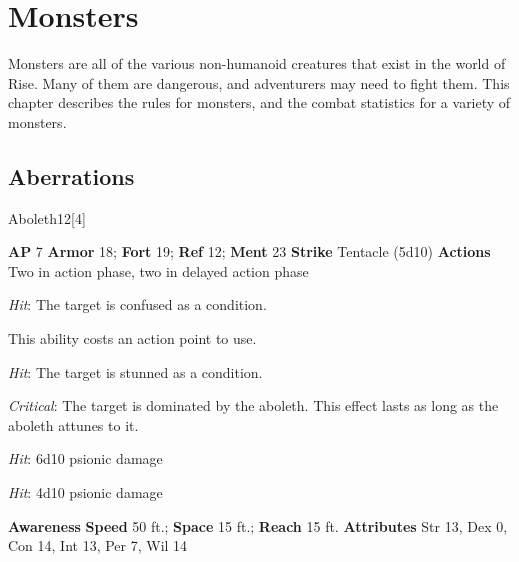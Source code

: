 \chapter{Monsters}
Monsters are all of the various non-humanoid creatures that exist in the world of Rise.
Many of them are dangerous, and adventurers may need to fight them.
This chapter describes the rules for monsters, and the combat statistics for a variety of monsters.
\section{Aberrations}
\begin{monsection}{Aboleth}{12}[4]
\vspace{-1em}\vspace{-1em}
\begin{spellcontent}
\begin{spelltargetinginfo}
{\textbf{AP} 7}
\pari \textbf{Armor} 18;
\textbf{Fort} 19;
\textbf{Ref} 12;
\textbf{Ment} 23
\pari \textbf{Strike} Tentacle  (5d10)
\pari \textbf{Actions} Two in action phase, two in delayed action phase
\end{spelltargetinginfo}
\begin{spelleffects}
\pari
{}
\par
\par \textit{Hit}: The target is confused as a condition.
\vspace{0.5em}
\pari
{}
\par
This ability costs an action point to use.
\par \textit{Hit}: The target is stunned as a condition.
\par \textit{Critical}:
The target is dominated by the aboleth.
This effect lasts as long as the aboleth attunes to it.
\vspace{0.5em}
\pari
{}
\par
\par \textit{Hit}: 6d10 psionic damage
\vspace{0.5em}
\pari
{}
\par
\par \textit{Hit}: 4d10 psionic damage
\end{spelleffects}
\end{spellcontent}
\begin{spellsubcontent}
\begin{spellfooter}
\pari \textbf{Awareness} 
\pari \textbf{Speed} 50 ft.;
\textbf{Space} 15 ft.;
\textbf{Reach} 15 ft.
\pari \textbf{Attributes}
Str 13,
Dex 0,
Con 14,
Int 13,
Per 7,
Wil 14
\end{spellfooter}
\end{spellsubcontent}
\end{monsection}
